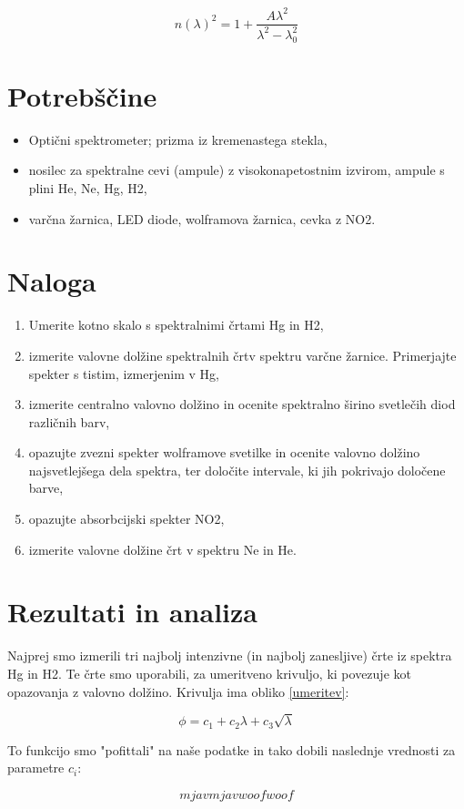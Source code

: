 \documentclass[12pt]{article}
\begin{document}
\begin{equation}
    n(\lambda)^2 = 1 + \frac{A\lambda ^2}{\lambda ^2-\lambda_0^2}
    \label{Seill}
\end{equation}

\section{Potrebščine}
\begin{itemize}
    \item Optični spektrometer; prizma iz kremenastega stekla,
    \item nosilec za spektralne cevi (ampule) z visokonapetostnim izvirom, ampule s plini He, Ne, Hg, H2,
    \item varčna žarnica, LED diode, wolframova žarnica, cevka z NO2.
\end{itemize}

\section{Naloga}

\begin{enumerate}
    \item Umerite kotno skalo s spektralnimi črtami Hg in H2,
    \item izmerite valovne dolžine spektralnih črtv spektru varčne žarnice. Primerjajte spekter s tistim, izmerjenim v Hg,
    \item izmerite centralno valovno dolžino in ocenite spektralno širino svetlečih diod različnih barv,
    \item opazujte zvezni spekter wolframove svetilke in ocenite valovno dolžino najsvetlejšega dela spektra, ter določite intervale, ki jih pokrivajo določene barve,
    \item opazujte absorbcijski spekter NO2,
    \item izmerite valovne dolžine črt v spektru Ne in He.
\end{enumerate}


\section{Rezultati in analiza}
Najprej smo izmerili tri najbolj intenzivne (in najbolj zanesljive) črte iz spektra Hg in H2. Te črte smo uporabili, za umeritveno krivuljo, ki povezuje kot opazovanja z valovno dolžino. Krivulja ima obliko \ref{umeritev}:

\begin{equation}
    \phi = c_1 + c_2\lambda + c_3\sqrt{\lambda}
    \label{umeritev}
\end{equation}

To funkcijo smo "pofittali" na naše podatke in tako dobili naslednje vrednosti za parametre $c_i$:

\begin{equation*}
    mjav mjav woof woof
\end{equation*}
\end{document}
